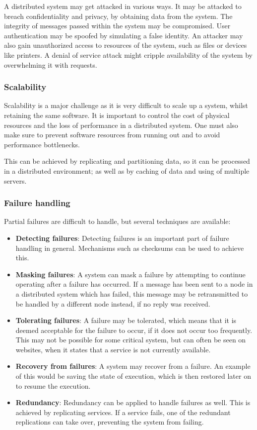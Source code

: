\documentclass[a4paper]{article}
\begin{document}
A distributed system may get attacked in various ways. It may be attacked to breach confidentiality and privacy, by obtaining data from the system. The integrity of messages passed within the system may be compromised. User authentication may be spoofed by simulating a false identity. An attacker may also gain unauthorized access to resources of the system, such as files or devices like printers. A denial of service attack might cripple availability of the system by overwhelming it with requests.

\subsubsection{Scalability}

Scalability is a major challenge as it is very difficult to scale up a system, whilst retaining the same software. It is important to control the cost of physical resources and the loss of performance in a distributed system. One must also make sure to prevent software resources from running out and to avoid performance bottlenecks.

This can be achieved by replicating and partitioning data, so it can be processed in a distributed environment; as well as by caching of data and using of multiple servers.

\subsubsection{Failure handling}

Partial failures are difficult to handle, but several techniques are available:
\begin{itemize}
\item \textbf{Detecting failures}: Detecting failures is an important part of failure handling in general. Mechanisms such as checksums can be used to achieve this.
\item \textbf{Masking failures}: A system can mask a failure by attempting to continue operating after a failure has occurred. If a message has been sent to a node in a distributed system which has failed, this message may be retransmitted to be handled by a different node instead, if no reply was received.
\item \textbf{Tolerating failures}: A failure may be tolerated, which means that it is deemed acceptable for the failure to occur, if it does not occur too frequently. This may not be possible for some critical system, but can often be seen on websites, when it states that a service is not currently available.
\item \textbf{Recovery from failures}: A system may recover from a failure. An example of this would be saving the state of execution, which is then restored later on to resume the execution.
\item \textbf{Redundancy}: Redundancy can be applied to handle failures as well. This is achieved by replicating services. If a service fails, one of the redundant replications can take over, preventing the system from failing.
\end{itemize}
\end{document}
